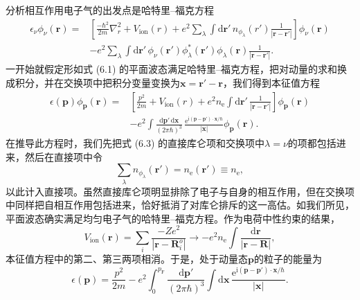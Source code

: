 分析相互作用电子气的出发点是哈特里–福克方程
\begin{equation*}
\begin{aligned}
\epsilon_\nu \phi_\nu(\mathbf{r}) ={} & \left[\frac{-\hbar^2}{2m}\nabla_r^2 + V_{\mathrm{ion}}(r) + e^2\sum_\lambda \int \mathrm{d}\mathbf{r}'\, n_{\phi_\lambda}(r')\frac{1}{|\mathbf{r} - \mathbf{r}'|}\right]\phi_\nu(\mathbf{r}) \\
& - e^2\sum_\lambda \int \mathrm{d}\mathbf{r}'\, \phi_\nu(\mathbf{r}')\phi_\lambda^*(\mathbf{r}')\phi_\lambda(\mathbf{r})\frac{1}{|\mathbf{r} - \mathbf{r}'|}.
\end{aligned}
\tag{6.3}
\end{equation*}
一开始就假定形如式 (6.1) 的平面波态满足哈特里–福克方程，把对动量的求和换成积分，并在交换项中把积分变量变换为$\mathbf{x} = \mathbf{r}' - \mathbf{r}$，我们得到本征值方程
\begin{equation*}
\begin{aligned}
\epsilon(\mathbf{p})\phi_{\mathbf{p}}(\mathbf{r}) ={} & \left[\frac{p^2}{2m} + V_{\mathrm{ion}}(r) + e^2 n_{\mathrm{e}}\int \mathrm{d}\mathbf{r}'\, \frac{1}{|\mathbf{r} - \mathbf{r}'|}\right]\phi_{\mathbf{p}}(\mathbf{r}) \\
& - e^2\int \frac{\mathrm{d}\mathbf{p}'\,\mathrm{d}\mathbf{x}}{(2\pi\hbar)^3}\, \frac{\mathrm{e}^{\mathrm{i}(\mathbf{p} - \mathbf{p}')\cdot\mathbf{x}/\hbar}}{|\mathbf{x}|}\phi_{\mathbf{p}}(\mathbf{r}).
\end{aligned}
\tag{6.4}
\end{equation*}
在推导此方程时，我们先把式 (6.3) 的直接库仑项和交换项中$\lambda = \nu$的项都包括进来，然后在直接项中令
\begin{equation*}
\sum_\lambda n_{\phi_\lambda}(\mathbf{r}') = n_{\mathrm{e}}(\mathbf{r}') \equiv n_{\mathrm{e}},
\tag{6.5}
\end{equation*}
以此计入直接项。虽然直接库仑项明显排除了电子与自身的相互作用，但在交换项中同样把自相互作用包括进来，恰好抵消了对库仑排斥的这一高估。如我们所见，平面波态确实满足均匀电子气的哈特里–福克方程。作为电荷中性约束的结果，
\begin{equation*}
V_{\mathrm{ion}}(\mathbf{r}) = \sum_i \frac{-Ze^2}{|\mathbf{r} - \mathbf{R}_i^o|} \to -e^2 n_{\mathrm{e}}\int \frac{\mathrm{d}\mathbf{r}}{|\mathbf{r} - \mathbf{R}|},
\tag{6.6}
\end{equation*}
本征值方程中的第二、第三两项相消。于是，处于动量态$\mathbf{p}$的粒子的能量为
\begin{equation*}
\epsilon(\mathbf{p}) = \frac{p^2}{2m} - e^2\int_0^{p_{\mathrm{F}}} \frac{\mathrm{d}\mathbf{p}'}{(2\pi\hbar)^3}\int \mathrm{d}\mathbf{x}\, \frac{\mathrm{e}^{\mathrm{i}(\mathbf{p} - \mathbf{p}')\cdot\mathbf{x}/\hbar}}{|\mathbf{x}|}.
\tag{6.7}
\end{equation*}

